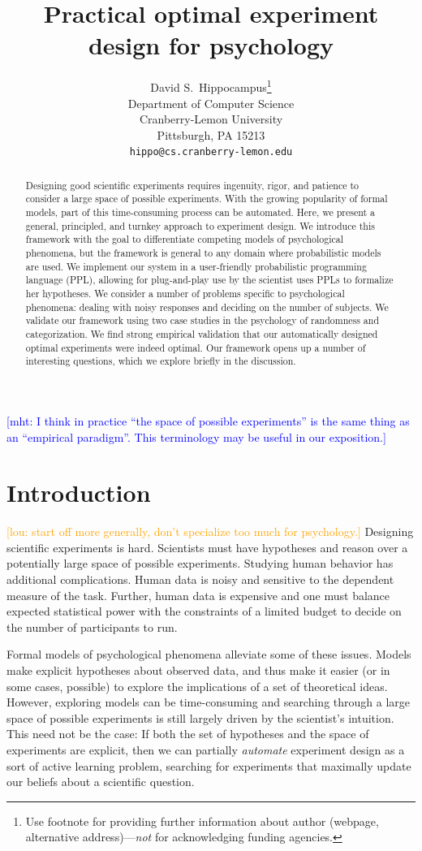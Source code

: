 \documentclass{article}
\title{Practical optimal experiment design for psychology}
\author{
  David S.~Hippocampus\thanks{Use footnote for providing further
    information about author (webpage, alternative
    address)---\emph{not} for acknowledging funding agencies.} \\
  Department of Computer Science\\
  Cranberry-Lemon University\\
  Pittsburgh, PA 15213 \\
  \texttt{hippo@cs.cranberry-lemon.edu} \\
}
\newcommand{\mht}[1]{\textcolor{Blue}{[mht: #1]}}
\newcommand{\lou}[1]{\textcolor{orange}{[lou: #1]}}
\begin{document}

\maketitle

\begin{abstract}

Designing good scientific experiments requires ingenuity, rigor, and patience to consider a large space of possible experiments.
With the growing popularity of formal models, part of this time-consuming process can be automated.
Here, we present a general, principled, and turnkey approach to experiment design.
We introduce this framework with the goal to differentiate competing models of psychological phenomena, but the framework is general to any domain where probabilistic models are used.
We implement our system in a user-friendly probabilistic programming language (PPL), allowing for plug-and-play use by the scientist uses PPLs to formalize her hypotheses.
We consider a number of problems specific to psychological phenomena: dealing with noisy responses and deciding on the number of subjects.
We validate our framework using two case studies in the psychology of randomness and categorization.
We find strong empirical validation that our automatically designed optimal experiments were indeed optimal.
Our framework opens up a number of interesting questions, which we explore briefly in the discussion.


\end{abstract}

\mht{I think in practice ``the space of possible experiments'' is the same thing as an ``empirical paradigm''. This terminology may be useful in our exposition.}

\section{Introduction}
\lou{start off more generally, don't specialize too much for psychology.}
Designing scientific experiments is hard.
Scientists must have hypotheses and reason over a potentially large space of possible experiments.
Studying human behavior has additional complications.
Human data is noisy and sensitive to the dependent measure of the task.
Further, human data is expensive and one must balance expected statistical power with the constraints of a limited budget to decide on the number of participants to run.

Formal models of psychological phenomena alleviate some of these issues.
Models make explicit hypotheses about observed data, and thus make it easier (or in some cases, possible) to explore the implications of a set of theoretical ideas.
However, exploring models can be time-consuming and searching through a large space of possible experiments is still largely driven by the scientist's intuition.
This need not be the case: If both the set of hypotheses and the space of experiments are explicit, then we can partially \emph{automate} experiment design as a sort of active learning problem, searching for experiments that maximally update our beliefs about a scientific question.
\end{document}
